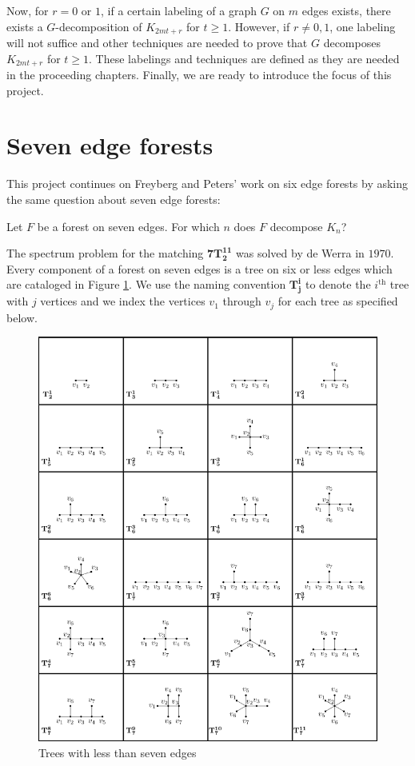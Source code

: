 Now, for $r=0$ or $1$, if a certain labeling of a graph $G$ on $m$ edges exists, there exists a $G$-decomposition of $K_{2mt+r}$ for $t\geq 1$. However, if $r\neq 0,1$, one labeling will not suffice and other techniques are needed to prove that $G$ decomposes $K_{2mt+r}$ for $t\geq 1$. These labelings and techniques are defined as they are needed in the proceeding chapters. Finally, we are ready to introduce the focus of this project.
\section{Seven edge forests}
This project continues on Freyberg and Peters' work on six edge forests by asking the same question about seven edge forests:
\begin{center}
  Let $F$ be a forest on seven edges. For which $n$ does $F$ decompose $K_{n}$? 
\end{center}
The spectrum problem for the matching $\mathbf{7T_{2}^{11}}$ was solved by de Werra in $1970$. Every component of a forest on seven edges is a tree on six or less edges which are cataloged in Figure \ref{fig:catalog}. We use the naming convention $\mathbf{T_{j}^i}$ to denote the $i^{\textrm{th}}$ tree with $j$ vertices and we index the vertices $v_{1}$ through $v_{j}$ for each tree as specified below.

\begin{figure}[H]
\begin{center}
\includegraphics[scale=0.85]{standalone/tree-chart}
\end{center}
\caption{Trees with less than seven edges}
\label{fig:catalog}
\end{figure}

